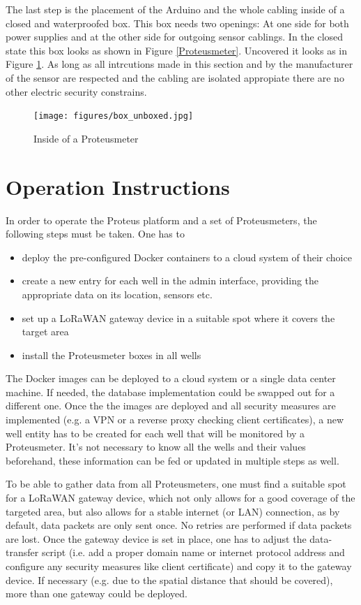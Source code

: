 \documentclass[11pt, letterpaper]{article}
\begin{document}
The last step is the placement of the Arduino and the whole cabling inside of a closed and waterproofed box. This box needs two openings: At one side for both power supplies and at the other side for outgoing sensor cablings. In the closed state this box looks as shown in Figure \ref{Proteusmeter}. Uncovered it looks as in Figure \ref{unboxed_box}. As long as all intrcutions made in this section and by the manufacturer of the sensor are respected and the cabling are isolated appropiate there are no other electric security constrains.
\begin{figure}[ht!]
	\centering
	\texttt{[image: figures/box\_unboxed.jpg]}
	\caption{Inside of a Proteusmeter \label{unboxed_box}}
\end{figure}


\section{Operation Instructions}
In order to operate the Proteus platform and a set of Proteusmeters, the following steps must be taken. One has to
\begin{itemize}
	\item deploy the pre-configured Docker containers to a cloud system of their choice
	\item create a new entry for each well in the admin  interface, providing the appropriate data on its location, sensors etc.
	\item set up a LoRaWAN gateway device in a suitable spot where it covers the target area
	\item install the Proteusmeter boxes in all wells
\end{itemize}

The Docker images can be deployed to a cloud system or a single data center machine. If needed, the database implementation could be swapped out for a different one. Once the the images are deployed and all security measures are implemented (e.g. a VPN or a reverse proxy checking client certificates), a new well entity has to be created for each well that will be monitored by a Proteusmeter. It's not necessary to know all the wells and their values beforehand, these information can be fed or updated in multiple steps as well.
\newline

To be able to gather data from all Proteusmeters, one must find a suitable spot for a LoRaWAN gateway device, which not only allows for a good coverage of the targeted area, but also allows for a stable internet (or LAN) connection, as by default, data packets are only sent once. No retries are performed if data packets are lost. Once the gateway device is set in place, one has to adjust the data-transfer script (i.e. add a proper domain name or internet protocol address and configure any security measures like client certificate) and copy it to the gateway device. If necessary (e.g. due to the spatial distance that should be covered), more than one gateway could be deployed.
\newline
\end{document}
